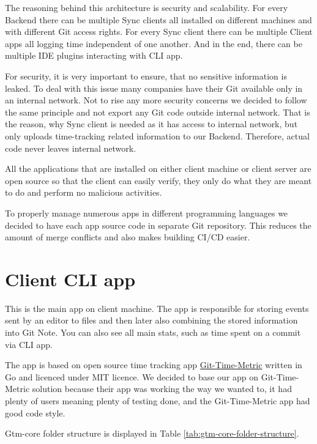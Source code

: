 The reasoning behind this architecture is security and scalability.
For every Backend there can be multiple Sync clients all installed on different machines and with different Git access rights.
For every Sync client there can be multiple Client apps all logging time independent of one another.
And in the end, there can be multiple IDE plugins interacting with CLI app.

For security, it is very important to ensure, that no sensitive information is leaked.
To deal with this issue many companies have their Git available only in an internal network.
Not to rise any more security concerns we decided to follow the same principle and not export any Git code outside internal network.
That is the reason, why Sync client is needed as it has access to internal network, but only uploads time-tracking related information to our Backend.
Therefore, actual code never leaves internal network.

All the applications that are installed on either client machine or client server are open source so that the client can easily verify,
they only do what they are meant to do and perform no malicious activities.

To properly manage numerous apps in different programming languages we decided to have each app source code in separate Git repository.
This reduces the amount of merge conflicts and also makes building CI/CD easier.


\section{Client CLI app}\label{sec:cli-app}
This is the main app on client machine.
The app is responsible for storing events sent by an editor to files and then later also combining the stored information into Git Note.
You can also see all main stats, such as time spent on a commit via CLI app.

The app is based on open source time tracking app \href{https://github.com/git-time-metric/gtm}{Git-Time-Metric} written in Go and licenced under MIT licence.
We decided to base our app on Git-Time-Metric solution because their app was working the way we wanted to, it had plenty of users meaning plenty of testing done,
and the Git-Time-Metric app had good code style.

Gtm-core folder structure is displayed in Table
\ref{tab:gtm-core-folder-structure}.

